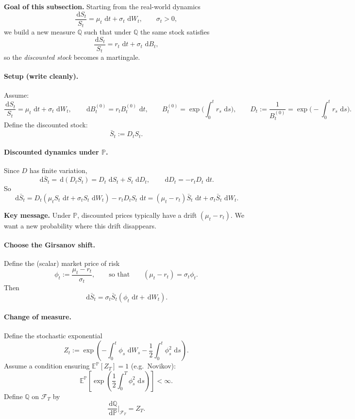 \documentclass[11pt]{article}
\newcommand{\Pbb}{\mathbb{P}}
\newcommand{\Qbb}{\mathbb{Q}}
\newcommand{\E}{\mathbb{E}}
\newcommand{\dd}{\,\mathrm{d}}
\newcommand{\1}{\mathbf{1}}
\begin{document}
\textbf{Goal of this subsection.}
Starting from the real-world dynamics
\[
\frac{\dd S_t}{S_t}=\mu_t\,\dd t+\sigma_t\,\dd W_t,
\qquad \sigma_t>0,
\]
we build a new measure $\Qbb$ such that under $\Qbb$ the same stock satisfies
\[
\frac{\dd S_t}{S_t}=r_t\,\dd t+\sigma_t\,\dd B_t,
\]
so the \emph{discounted stock} becomes a martingale.


\paragraph{Setup (write cleanly).}
Assume:
\[
\frac{\dd S_t}{S_t}=\mu_t\,\dd t+\sigma_t\,\dd W_t,
\qquad
\dd B_t^{(0)}=r_t B_t^{(0)}\,\dd t,
\qquad
B_t^{(0)}=\exp\Big(\int_0^t r_s\,\dd s\Big),
\qquad
D_t:=\frac{1}{B_t^{(0)}}=\exp\Big(-\int_0^t r_s\,\dd s\Big).
\]
Define the discounted stock:
\[
\bar S_t := D_t S_t.
\]

\paragraph{Discounted dynamics under $\Pbb$.}
Since $D$ has finite variation,
\[
\dd\bar S_t = \dd(D_t S_t)=D_t\,\dd S_t + S_t\,\dd D_t,
\qquad
\dd D_t = -r_t D_t\,\dd t.
\]
So
\[
\dd\bar S_t
=
D_t(\mu_t S_t\,\dd t+\sigma_t S_t\,\dd W_t) - r_t D_t S_t\,\dd t
=
(\mu_t-r_t)\bar S_t\,\dd t+\sigma_t \bar S_t\,\dd W_t.
\]


\textbf{Key message.}
Under $\Pbb$, discounted prices typically have a drift $(\mu_t-r_t)$.
We want a new probability where this drift disappears.


\paragraph{Choose the Girsanov shift.}
Define the (scalar) market price of risk
\[
\phi_t := \frac{\mu_t-r_t}{\sigma_t},
\qquad\text{so that}\qquad
(\mu_t-r_t)=\sigma_t \phi_t.
\]
Then
\[
\dd\bar S_t = \sigma_t \bar S_t(\phi_t\,\dd t + \dd W_t).
\]

\paragraph{Change of measure.}
Define the stochastic exponential
\[
Z_t
:=
\exp\!\left(
-\int_0^t \phi_s\,\dd W_s
-\frac12\int_0^t \phi_s^2\,\dd s
\right).
\]
Assume a condition ensuring $\E^{\Pbb}[Z_T]=1$ (e.g.\ Novikov):
\[
\E^{\Pbb}\!\left[\exp\!\left(\frac12\int_0^T \phi_s^2\,\dd s\right)\right]<\infty.
\]
Define $\Qbb$ on $\mathcal F_T$ by
\[
\frac{\dd\Qbb}{\dd\Pbb}\Big|_{\mathcal F_T}=Z_T.
\]
\end{document}
